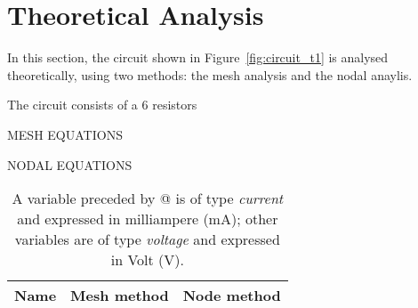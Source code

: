 \section{Theoretical Analysis}
\label{sec:analysis}

In this section, the circuit shown in Figure~\ref{fig:circuit_t1} is analysed
theoretically, using two methods: the mesh analysis and the nodal anaylis.


The circuit consists of a 6 resistors 


MESH EQUATIONS


NODAL EQUATIONS



\begin{table}[h]
  \centering
  \begin{tabular}{|l|r|r|}
    \hline    
    {\bf Name} & {\bf Mesh method} & {\bf Node method}\\ \hline
    
  \end{tabular}
  \caption{A variable preceded by @ is of type {\em current}
    and expressed in milliampere (mA); other variables are of type {\it voltage} and expressed in
    Volt (V).}
  \label{tab:theoretical}
\end{table}


